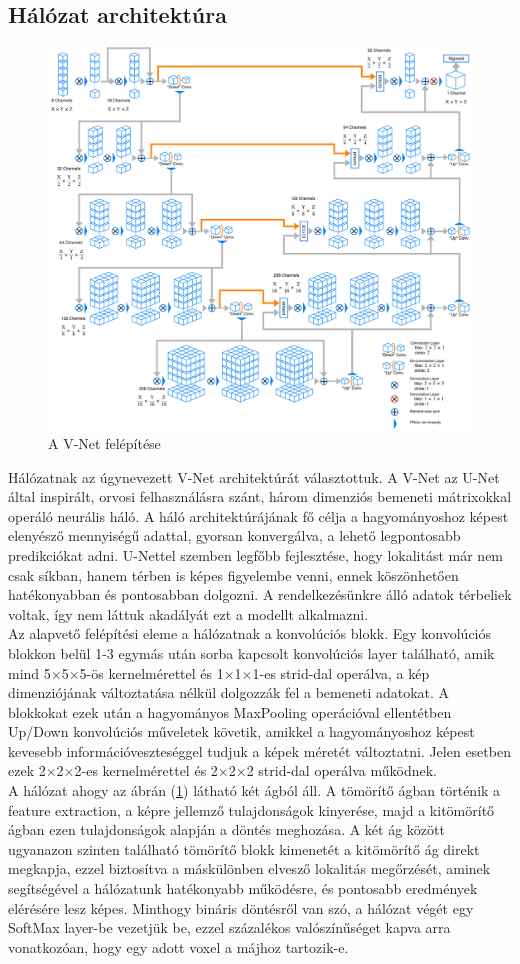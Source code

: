 \documentclass[a4paper]{article}
\begin{document}
	\subsection{Hálózat architektúra}
	\begin{figure}[h]
		\centering
		\includegraphics[width=0.5\linewidth]{"VNetDiagram"}
		\caption{A V-Net felépítése}
		\label{fig:vnetdiagram}
	\end{figure}
	Hálózatnak az úgynevezett V-Net \cite{2016arXiv160604797M} architektúrát választottuk. A V-Net az U-Net\cite{2015arXiv150504597R} által inspirált, orvosi felhasználásra szánt, három dimenziós bemeneti mátrixokkal operáló neurális háló.  A háló architektúrájának fő célja a hagyományoshoz képest elenyésző mennyiségű adattal, gyorsan konvergálva, a lehető legpontosabb predikciókat adni. U-Nettel szemben legfőbb fejlesztése, hogy lokalitást már nem csak síkban, hanem térben is képes figyelembe venni, ennek köszönhetően hatékonyabban és pontosabban dolgozni. A rendelkezésünkre álló adatok térbeliek voltak, így nem láttuk akadályát ezt  a modellt alkalmazni.
	\\[1em]
	Az alapvető felépítési eleme a hálózatnak a konvolúciós blokk. Egy konvolúciós blokkon belül 1-3 egymás után sorba kapcsolt konvolúciós layer található, amik mind 5$\times$5$\times$5-ös kernelmérettel és 1$\times$1$\times$1-es strid-dal operálva, a kép dimenziójának változtatása nélkül dolgozzák fel a bemeneti adatokat. A blokkokat ezek után a hagyományos MaxPooling operációval ellentétben Up/Down konvolúciós műveletek követik, amikkel a hagyományoshoz képest kevesebb információveszteséggel tudjuk a képek méretét változtatni. Jelen esetben ezek 2$\times$2$\times$2-es kernelmérettel és 2$\times$2$\times$2 strid-dal operálva működnek.
	\\[1em]
	A hálózat ahogy az ábrán (\ref{fig:vnetdiagram}) látható két ágból áll. A tömörítő ágban történik a feature extraction, a képre jellemző tulajdonságok kinyerése, majd a kitömörítő ágban ezen tulajdonságok alapján a döntés meghozása. A két ág között ugyanazon szinten található tömörítő blokk kimenetét a kitömörítő ág direkt megkapja, ezzel biztosítva a máskülönben elvesző lokalitás megőrzését, aminek segítségével a hálózatunk hatékonyabb működésre, és pontosabb eredmények elérésére lesz képes. Minthogy bináris döntésről van szó, a hálózat végét egy SoftMax layer-be vezetjük be, ezzel százalékos valószínűséget kapva arra vonatkozóan, hogy egy adott voxel a májhoz tartozik-e.
\end{document}
